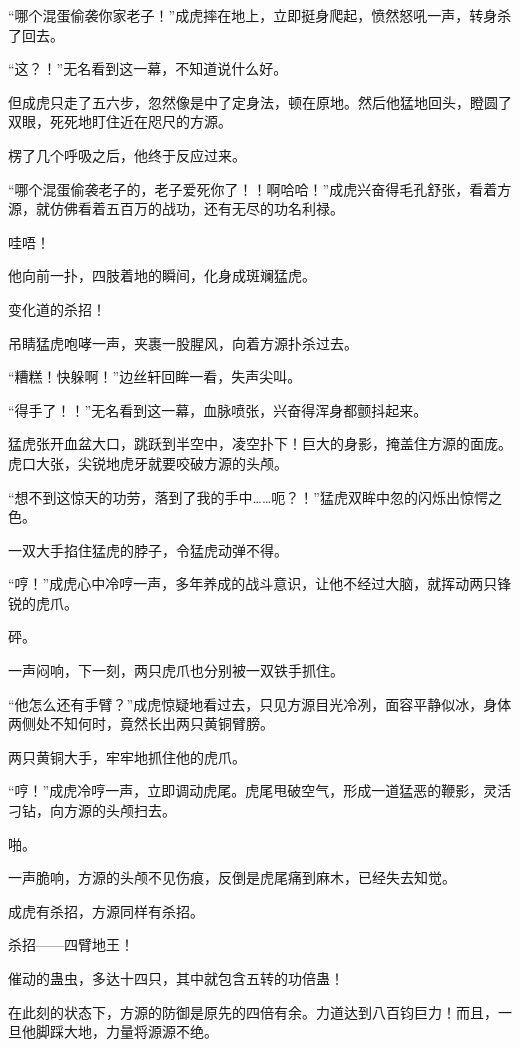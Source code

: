 \begin{this_body}
“哪个混蛋偷袭你家老子！”成虎摔在地上，立即挺身爬起，愤然怒吼一声，转身杀了回去。

“这？！”无名看到这一幕，不知道说什么好。

但成虎只走了五六步，忽然像是中了定身法，顿在原地。然后他猛地回头，瞪圆了双眼，死死地盯住近在咫尺的方源。

楞了几个呼吸之后，他终于反应过来。

“哪个混蛋偷袭老子的，老子爱死你了！！啊哈哈！”成虎兴奋得毛孔舒张，看着方源，就仿佛看着五百万的战功，还有无尽的功名利禄。

哇唔！

他向前一扑，四肢着地的瞬间，化身成斑斓猛虎。

变化道的杀招！

吊睛猛虎咆哮一声，夹裹一股腥风，向着方源扑杀过去。

“糟糕！快躲啊！”边丝轩回眸一看，失声尖叫。

“得手了！！”无名看到这一幕，血脉喷张，兴奋得浑身都颤抖起来。

猛虎张开血盆大口，跳跃到半空中，凌空扑下！巨大的身影，掩盖住方源的面庞。虎口大张，尖锐地虎牙就要咬破方源的头颅。

“想不到这惊天的功劳，落到了我的手中……呃？！”猛虎双眸中忽的闪烁出惊愕之色。

一双大手掐住猛虎的脖子，令猛虎动弹不得。

“哼！”成虎心中冷哼一声，多年养成的战斗意识，让他不经过大脑，就挥动两只锋锐的虎爪。

砰。

一声闷响，下一刻，两只虎爪也分别被一双铁手抓住。

“他怎么还有手臂？”成虎惊疑地看过去，只见方源目光冷冽，面容平静似冰，身体两侧处不知何时，竟然长出两只黄铜臂膀。

两只黄铜大手，牢牢地抓住他的虎爪。

“哼！”成虎冷哼一声，立即调动虎尾。虎尾甩破空气，形成一道猛恶的鞭影，灵活刁钻，向方源的头颅扫去。

啪。

一声脆响，方源的头颅不见伤痕，反倒是虎尾痛到麻木，已经失去知觉。

成虎有杀招，方源同样有杀招。

杀招——四臂地王！

催动的蛊虫，多达十四只，其中就包含五转的功倍蛊！

在此刻的状态下，方源的防御是原先的四倍有余。力道达到八百钧巨力！而且，一旦他脚踩大地，力量将源源不绝。


\end{this_body}
